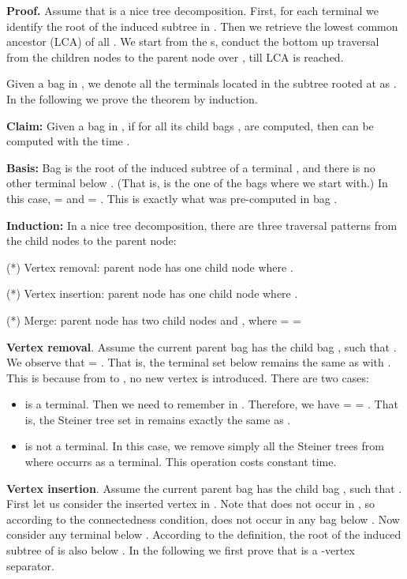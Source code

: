 \documentclass[preprint,12pt]{elsarticle}
\newenvironment{proof}{\begin{trivlist}\item[]\textbf{Proof.}}{\end{trivlist}}
\begin{document}
\begin{proof}
Assume that  is a nice tree decomposition.
First, for each terminal  we  identify the root of the induced subtree  in .
Then we retrieve the lowest common ancestor (LCA) of all .
We start from the s, conduct the bottom up traversal from the children nodes to the parent node
over , till LCA is reached.

Given a bag  in , we denote all the terminals located in the subtree rooted at  as .
In the following we prove the theorem by induction.

\noindent
{\bf Claim:} Given a bag  in , if for all its child bags ,
 are computed, then 
 can be computed with the time .

\noindent
{\bf Basis:} Bag  is the root of the induced subtree of a terminal , and there is no other terminal below .
(That is,  is the one of the bags where we start with.) 
In this case,  =  and  = .
This is exactly what was pre-computed in bag .

\noindent
{\bf Induction:} 
In a nice tree decomposition, there are three traversal patterns from the child nodes
to the parent node:


\noindent (*) Vertex removal:
parent node  has one child node  where .


\noindent (*) Vertex insertion: 
parent node  has one child node  where .



\noindent (*) Merge: 
parent node  has two child nodes  and ,
where =  = 


\noindent
{\bf Vertex removal}. Assume the current parent bag  has the child bag
, such that  .
We observe that  = . That is, the terminal set below  
remains the same as with . This is because from  to , no new vertex
is introduced. There are two cases:
\begin{itemize}
\item
 is a terminal. Then we need to remember  in .
Therefore, we have  = 
 =
.
That is, the Steiner tree set in  remains exactly the same as .
\item
 is not a terminal. 
In this case, we remove simply all the Steiner trees
from  where  occurrs as a terminal.
This operation costs constant time.
\end{itemize}

\noindent
{\bf Vertex insertion}. Assume the current parent bag  has the child bag
, such that . 
First let us consider the inserted vertex  in . Note that  does not occur
in , so according to the connectedness condition,  does not occur
in any bag below . Now consider any terminal   below . 
According to the definition, the root of the induced subtree of  is also below .
In the following we first prove that  is a -vertex separator.



\end{proof}
\end{document}
